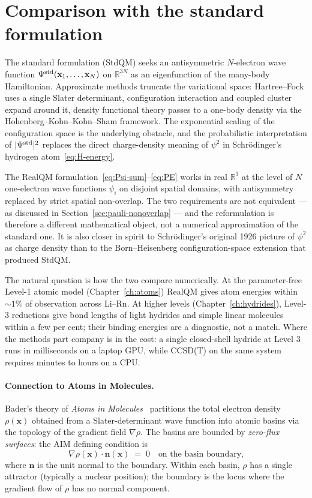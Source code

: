 \section{Comparison with the standard formulation}\label{sec:vs-stdqm}

The standard formulation (StdQM) seeks an antisymmetric $N$-electron wave function $\Psi^{\rm std}(\mathbf{x}_1, \ldots, \mathbf{x}_N)$ on $\mathbb{R}^{3N}$ as an eigenfunction of the many-body Hamiltonian. Approximate methods truncate the variational space: Hartree--Fock uses a single Slater determinant, configuration interaction and coupled cluster expand around it, density functional theory passes to a one-body density via the Hohenberg--Kohn--Kohn--Sham framework. The exponential scaling of the configuration space is the underlying obstacle, and the probabilistic interpretation of $|\Psi^{\rm std}|^2$ replaces the direct charge-density meaning of $\psi^2$ in Schr\"odinger's hydrogen atom~\eqref{eq:H-energy}.

The RealQM formulation~\eqref{eq:Psi-sum}--\eqref{eq:PE} works in real $\mathbb{R}^3$ at the level of $N$ one-electron wave functions $\psi_i$ on disjoint spatial domains, with antisymmetry replaced by strict spatial non-overlap. The two requirements are not equivalent --- as discussed in Section~\ref{sec:pauli-nonoverlap} --- and the reformulation is therefore a different mathematical object, not a numerical approximation of the standard one. It is also closer in spirit to Schr\"odinger's original 1926 picture of $\psi^2$ as charge density than to the Born--Heisenberg configuration-space extension that produced StdQM.

The natural question is how the two compare numerically. At the parameter-free Level-1 atomic model (Chapter~\ref{ch:atoms}) RealQM gives atom energies within ${\sim}1\%$ of observation across Li--Rn. At higher levels (Chapter~\ref{ch:hydrides}), Level-3 reductions give bond lengths of light hydrides and simple linear molecules within a few per cent; their binding energies are a diagnostic, not a match. Where the methods part company is in the cost: a single closed-shell hydride at Level 3 runs in milliseconds on a laptop GPU, while CCSD(T) on the same system requires minutes to hours on a CPU.

\paragraph{Connection to Atoms in Molecules.}
Bader's theory of \emph{Atoms in Molecules}~\cite{Bader90} partitions the total electron density $\rho(\mathbf{x})$ obtained from a Slater-determinant wave function into atomic basins via the topology of the gradient field $\nabla \rho$. The basins are bounded by \emph{zero-flux surfaces}: the AIM defining condition is
\[
\nabla \rho(\mathbf{x}) \cdot \mathbf{n}(\mathbf{x}) \;=\; 0
\quad\text{on the basin boundary,}
\]
where $\mathbf{n}$ is the unit normal to the boundary. Within each basin, $\rho$ has a single attractor (typically a nuclear position); the boundary is the locus where the gradient flow of $\rho$ has no normal component.

